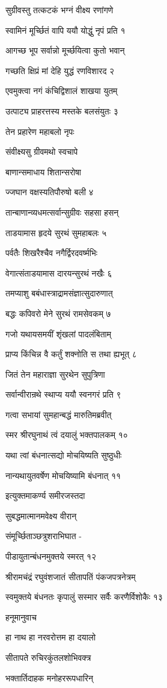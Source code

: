 सुग्रीवस्तु तत्कटकं भग्नं वीक्ष्य रणांगणे

स्वामिनं मूर्च्छितं वापि ययौ योद्धुं नृपं प्रति १

आगच्छ भूप सर्वान्नो मूर्च्छयित्वा कुतो भवान्

गच्छति क्षिप्रं मां देहि युद्धं रणविशारद २

एवमुक्त्वा नगं कंचिद्विशालं शाखया युतम्

उत्पाट्य प्राहरत्तस्य मस्तके बलसंयुतः ३

तेन प्रहारेण महाबलो नृपः

संवीक्ष्यसु ग्रीवमथो स्वचापे

बाणान्समाधाय शितान्सरोषा

ज्जघान वक्षस्यतिपौरुषो बली ४

तान्बाणान्व्यधमत्सर्वान्सुग्रीवः सहसा हसन्

ताडयामास हृदये सुरथं सुमहाबलः ५

पर्वतैः शिखरैश्चैव नगैर्द्विरदवर्ष्मभिः

वेगात्संताडयामास दारयन्सुरथं नखैः ६

तमप्याशु बबंधास्त्राद्रामसंज्ञात्सुदारुणात्

बद्धः कपिवरो मेने सुरथं रामसेवकम् ७

गजो यथायसमयीं शृंखलां पादलंबिताम्

प्राप्य किंचिन्न वै कर्तुं शक्नोति स तथा ह्यभूत् ८

जितं तेन महाराज्ञा सुरथेन सुपुत्रिणा

सर्वान्वीरान्रथे स्थाप्य ययौ स्वनगरं प्रति ९

गत्वा सभायां सुमहान्बद्धं मारुतिमब्रवीत्

स्मर श्रीरघुनाथं त्वं दयालुं भक्तपालकम् १०

यथा त्वां बंधनात्सद्यो मोचयिष्यति सुष्ठुधीः

नान्यथायुतवर्षेण मोचयिष्यामि बंधनात् ११

इत्युक्तमाकर्ण्य समीरजस्तदा

सुबद्धमात्मानमवेक्ष्य वीरान्

संमूर्च्छिताञ्छत्रुशराभिघात -

पीडायुतान्बंधनमुक्तये स्मरत् १२

श्रीरामचंद्रं रघुवंशजातं सीतापतिं पंकजपत्रनेत्रम्

स्वमुक्तये बंधनतः कृपालुं सस्मार सर्वैः करणैर्विशोकैः १३

हनूमानुवाच

हा नाथ हा नरवरोत्तम हा दयालो

सीतापते रुचिरकुंतलशोभिवक्त्र

भक्तार्तिदाहक मनोहररूपधारिन्

